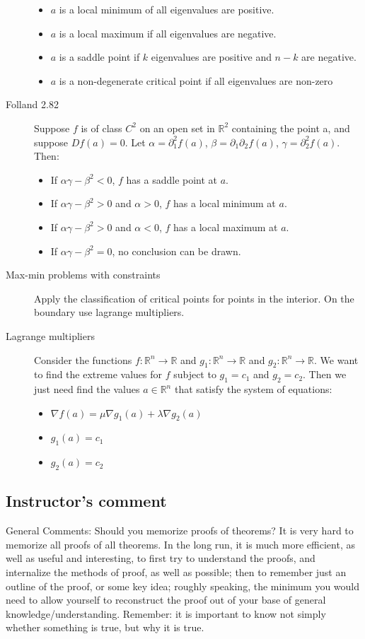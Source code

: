 \begin{description}
	\begin{itemize}
		\item $a$ is a local minimum of all eigenvalues are positive.
		\item $a$ is a local maximum if all eigenvalues are negative.
		\item $a$ is a saddle point if $k$ eigenvalues are positive and $n-k$ are negative.
		\item $a$ is a non-degenerate critical point if all eigenvalues are non-zero
	\end{itemize}
\item[Folland 2.82] Suppose $f$ is of class $C^2$ on an open set in $\mathbb{R}^2$ containing the point a, and suppose $Df(a) = 0$. Let $\alpha = \partial_1^2 f(a)$, $\beta = \partial_1\partial_2 f(a)$, $\gamma = \partial_2^2 f(a)$. Then:
	\begin{itemize}
		\item If $\alpha\gamma - \beta^2 < 0$, $f$ has a saddle point at $a$.
		\item If $\alpha\gamma - \beta^2 > 0$ and $\alpha > 0$, $f$ has a local minimum at $a$.
		\item If $\alpha\gamma - \beta^2 > 0$ and $\alpha < 0$, $f$ has a local maximum at $a$.
		\item If $\alpha\gamma - \beta^2 = 0$, no conclusion can be drawn.
	\end{itemize}
\item[Max-min problems with constraints]
Apply the classification of critical points for points in the interior. On the boundary use lagrange multipliers.
\item[Lagrange multipliers]
Consider the functions $f: \mathbb{R}^n \to \mathbb{R}$ and $g_1: \mathbb{R}^n \to \mathbb{R}$ and $g_2: \mathbb{R}^n \to \mathbb{R}$. We want to find the extreme values for $f$ subject to $g_1 = c_1$ and $g_2 = c_2$. Then we just need find the values $a \in \mathbb{R}^n$ that satisfy the system of equations:
	\begin{itemize}
		\item $\nabla f(a) = \mu \nabla g_1(a) + \lambda \nabla g_2(a)$
		\item $g_1(a) = c_1$
		\item $g_2(a) = c_2$
	\end{itemize}
\end{description}



\subsection{Instructor's comment}
General Comments: Should you memorize proofs of theorems? It is very hard to
memorize all proofs of all theorems. In the long run, it is much more efficient, as well
as useful and interesting, to first try to understand the proofs, and internalize the
methods of proof, as well as possible; then to remember just an outline of the proof,
or some key idea; roughly speaking, the minimum you would need to allow yourself
to reconstruct the proof out of your base of general knowledge/understanding.
Remember: it is important to know not simply whether something is true, but why
it is true.



